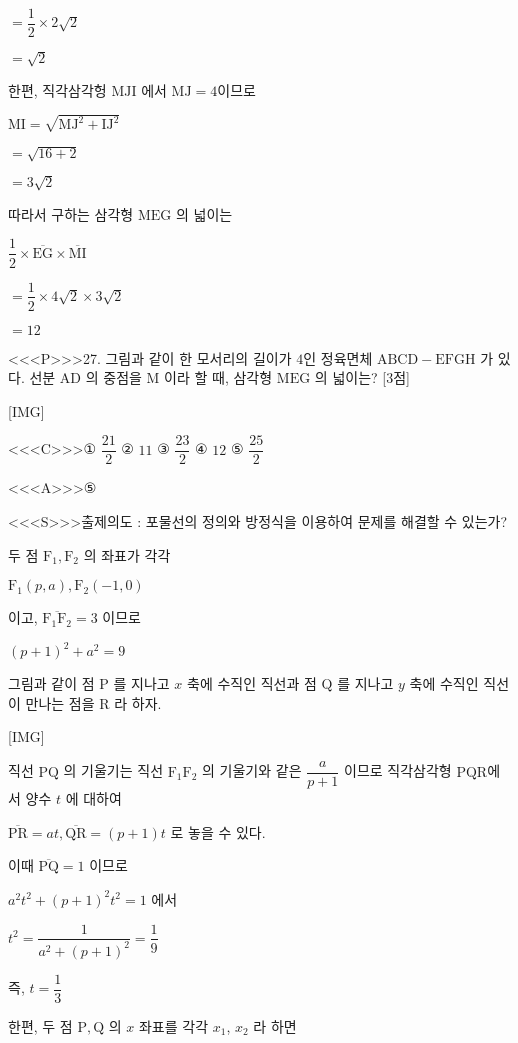 \documentclass{oblivoir}
\begin{document}
$=\dfrac{1}{2} \times 2 \sqrt{2}$

$=\sqrt{2}$

한편, 직각삼각헝 $\mathrm{MJI}$ 에서 $\mathrm{MJ} =4$이므로

$\mathrm{MI} =\sqrt{\mathrm{MJ}^{2}+\mathrm{IJ}^{2}}$

$=\sqrt{16+2}$

$=3 \sqrt{2}$

따라서 구하는 삼각형 $\mathrm{MEG}$ 의 넓이는

$\dfrac{1}{2} \times \overline{\mathrm{EG}} \times \overline{\mathrm{MI}}$

$=\dfrac{1}{2} \times 4 \sqrt{2} \times 3 \sqrt{2}$

$=12$


<<<P>>>27. 그림과 같이 한 모서리의 길이가 $4$인 정육면체 $\mathrm{ABCD}-\mathrm{EFGH}$ 가 있다. 선분 $\mathrm{AD}$ 의 중점을 $\mathrm{M}$ 이라 할 때, 삼각형 $\mathrm{MEG}$ 의 넓이는? [3점]

[IMG]


<<<C>>>① $\dfrac{21}{2}$
② $11$
③ $\dfrac{23}{2}$
④ $12$
⑤ $\dfrac{25}{2}$


<<<A>>>⑤

<<<S>>>출제의도 : 포물선의 정의와 방정식을 이용하여 문제를 해결할 수 있는가?

두 점 $\mathrm{F}_{1}, \mathrm{F}_{2}$ 의 좌표가 각각

$\mathrm{F}_{1}(p, a), \mathrm{F}_{2}(-1,0)$

이고, $\overline{\mathrm{F}_{1} \mathrm{F}_{2}}=3$ 이므로

$(p+1)^{2}+a^{2}=9$

그림과 같이 점 $\mathrm{P}$ 를 지나고 $x$ 축에 수직인 직선과 점 $\mathrm{Q}$ 를 지나고 $y$ 축에 수직인
직선이 만나는 점을 $\mathrm{R}$ 라 하자.

[IMG]

직선 $\mathrm{PQ}$ 의 기울기는 직선 $\mathrm{F}_{1} \mathrm{F}_{2}$ 의 기울기와 같은 $\dfrac{a}{p+1}$ 이므로 직각삼각형 $\mathrm{PQR}$에서 양수 $t$ 에 대하여

$\overline{\mathrm{PR}}=a t, \overline{\mathrm{QR}}=(p+1) t$
로 놓을 수 있다.

이때 $\overline{\mathrm{PQ}}=1$ 이므로

$a^{2} t^{2}+(p+1)^{2} t^{2}=1$
에서

$t^{2}=\dfrac{1}{a^{2}+(p+1)^{2}}=\dfrac{1}{9}$

즉, $t=\dfrac{1}{3}$

한편, 두 점 $\mathrm{P}, \mathrm{Q}$ 의 $x$ 좌표를 각각 $x_{1}$, $x_{2}$ 라 하면
\end{document}
